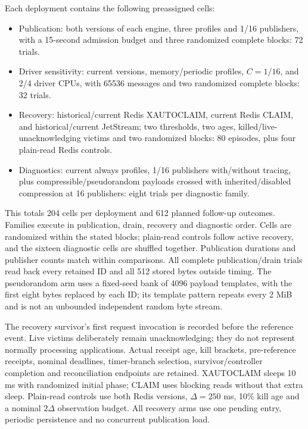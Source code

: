 \documentclass[11pt]{article}
\theoremstyle{definition}
\begin{document}
Each deployment contains the following preassigned cells:
\begin{itemize}[leftmargin=1.5em]
\item Publication: both versions of each engine, three profiles and 1/16 publishers, with a 15-second admission budget and three randomized complete blocks: 72 trials.
\item Driver sensitivity: current versions, memory/periodic profiles, $C=1/16$, and 2/4 driver CPUs, with 65536 messages and two randomized complete blocks: 32 trials.
\item Recovery: historical/current Redis XAUTOCLAIM, current Redis CLAIM, and historical/current JetStream; two thresholds, two ages, killed/live-unacknowledging victims and two randomized blocks: 80 episodes, plus four plain-read Redis controls.
\item Diagnostics: current always profiles, 1/16 publishers with/without tracing, plus compressible/pseudorandom payloads crossed with inherited/disabled compression at 16 publishers: eight trials per diagnostic family.
\end{itemize}

This totals 204 cells per deployment and 612 planned follow-up outcomes. Families execute in publication, drain, recovery and diagnostic order. Cells are randomized within the stated blocks; plain-read controls follow active recovery, and the sixteen diagnostic cells are shuffled together. Publication durations and publisher counts match within comparisons. All complete publication/drain trials read back every retained ID and all 512 stored bytes outside timing. The pseudorandom arm uses a fixed-seed bank of 4096 payload templates, with the first eight bytes replaced by each ID; its template pattern repeats every 2 MiB and is not an unbounded independent random byte stream.

The recovery survivor's first request invocation is recorded before the reference event. Live victims deliberately remain unacknowledging; they do not represent normally processing applications. Actual receipt age, kill brackets, pre-reference receipts, nominal deadlines, timer-branch selection, survivor/controller completion and reconciliation endpoints are retained. XAUTOCLAIM sleeps 10 ms with randomized initial phase; CLAIM uses blocking reads without that extra sleep. Plain-read controls use both Redis versions, $\Delta=250$ ms, 10\% kill age and a nominal $2\Delta$ observation budget. All recovery arms use one pending entry, periodic persistence and no concurrent publication load.
\end{document}
